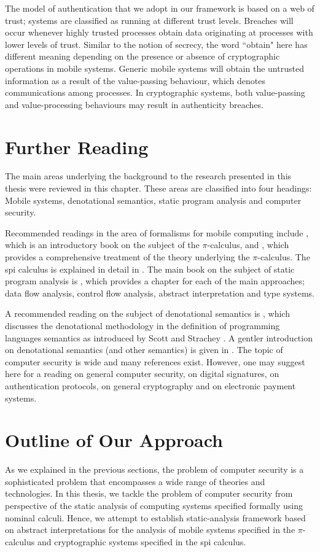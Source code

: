 \documentclass[10pt,a4paper,final,oneside,fleqn]{book}
\begin{document}
The model of authentication that we adopt in our framework is based on a web of trust; systems are classified as running at different trust levels. Breaches will occur whenever highly trusted processes obtain data originating at processes with lower levels of trust.  Similar to the notion of secrecy, the word ``obtain" here has different meaning depending on the presence or absence of cryptographic operations in mobile systems. Generic mobile systems will obtain the untrusted information as a result of the value-passing behaviour, which denotes communications among processes.  In cryptographic systems, both value-passing and value-processing behaviours may result in authenticity breaches.
\section{Further Reading}
The main areas underlying the background to the research presented in this thesis were reviewed in this chapter.  These areas are classified into four headings: Mobile systems, denotational semantics, static program analysis and computer security.

Recommended readings in the area of formalisms for mobile computing include \cite{milner2}, which is an introductory book on the subject of the $\pi$-calculus, and \cite{sangiorgi1}, which provides a comprehensive treatment of the theory underlying the $\pi$-calculus. The spi calculus is explained in detail in \cite{abadi1b}. The main book on the subject of static program analysis is \cite{nielson1}, which provides a chapter for each of the main approaches; data flow analysis, control flow analysis, abstract interpretation and type systems.

A recommended reading on the subject of denotational semantics is \cite{stoy1}, which discusses the denotational methodology in the definition of programming languages semantics as introduced by Scott and Strachey \cite{strachey1,scott2,scott1}. A gentler introduction on denotational semantics (and other semantics) is given in \cite{winskel1}. The topic of computer security is wide and many references exist.  However, one may suggest here \cite{goll1} for a reading on general computer security, \cite{ford1} on digital signatures, \cite{burrows1,clark1} on authentication protocols, \cite{schneier1,menezes1} on general cryptography and \cite{omahony1} on electronic payment systems.
\section{Outline of Our Approach}
As we explained in the previous sections, the problem of computer security is a sophisticated problem that encompasses a wide range of theories and technologies. In this thesis, we tackle the problem of computer security from perspective of the static analysis of computing systems specified formally using nominal calculi.  Hence, we attempt to establish static-analysis framework based on abstract interpretations for the analysis of mobile systems specified in the $\pi$-calculus and cryptographic systems specified in the spi calculus.
\end{document}
